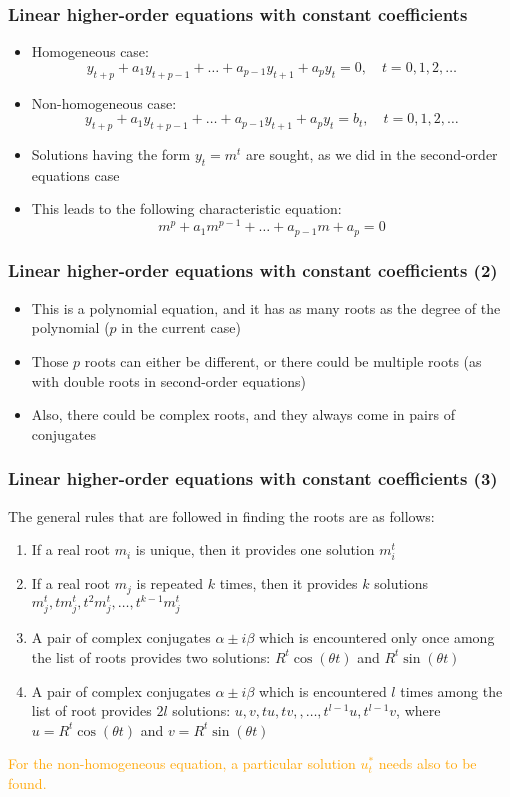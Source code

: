 \documentclass[10pt,usenames,dvipsnames]{beamer}
\theoremstyle{definition}
\begin{document}
\begin{frame}[fragile]
\frametitle{Linear higher-order equations with constant coefficients}
\begin{itemize}
	\item Homogeneous case:
	\[
		y_{t+p} + a_{1}y_{t+p-1} + \ldots + a_{p-1}y_{t+1} + a_{p}y_{t} = 0, \quad t = 0, 1, 2, \ldots
	\]
	\item Non-homogeneous case:
	\[
		y_{t+p} + a_{1}y_{t+p-1} + \ldots + a_{p-1}y_{t+1} + a_{p}y_{t} = b_{t}, \quad t = 0, 1, 2, \ldots
	\]
	\item Solutions having the form $y_{t} = m^{t}$ are sought, as we did in the second-order equations case
	\item This leads to the following characteristic equation:
	\[
		m^{p} + a_{1}m^{p-1} + \ldots + a_{p-1}m + a_{p} = 0
	\]
	
\end{itemize}
\end{frame}

\begin{frame}[fragile]
\frametitle{Linear higher-order equations with constant coefficients (2)}
\begin{itemize}
	\item This is a polynomial equation, and it has as many roots as the degree of the polynomial ($p$ in the current case)
	\item Those $p$ roots can either be different, or there could be multiple roots (as with double roots in second-order equations)
	\item Also, there could be complex roots, and they always come in pairs of conjugates
\end{itemize}
\end{frame}

\begin{frame}[fragile]
\frametitle{Linear higher-order equations with constant coefficients (3)}
The general rules that are followed in finding the roots are as follows:
	\begin{enumerate}
		\item If a real root $m_{i}$ is unique, then it provides one solution $m_{i}^{t}$
		\item If a real root $m_{j}$ is repeated $k$ times, then it provides $k$ solutions $m_{j}^{t}, tm_{j}^{t}, t^{2}m_{j}^{t},\ldots,t^{k-1}m_{j}^{t}$
		\item A pair of complex conjugates  $\alpha \pm i\beta$ which is encountered only once among the list of roots provides two solutions: $R^{t}\cos(\theta t)$ and $R^{t}\sin(\theta t)$
		\item A pair of complex conjugates  $\alpha \pm i\beta$ which is encountered $l$ times among the list of root provides $2l$ solutions: $u, v, tu, tv,, \ldots, t^{l-1}u, t^{l-1}v$, where  $u = R^{t}\cos(\theta t)$ and $v = R^{t}\sin(\theta t)$
	\end{enumerate}
	\textcolor{orange}{For the non-homogeneous equation, a particular solution $u_{t}^{*}$ needs also to be found.}
\end{frame}
\end{document}
